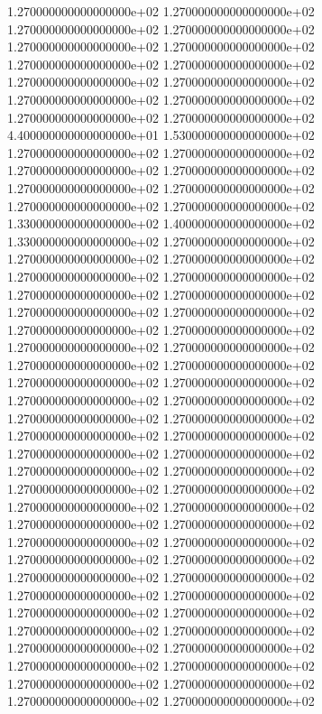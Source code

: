 1.270000000000000000e+02 1.270000000000000000e+02 1.270000000000000000e+02 1.270000000000000000e+02 1.270000000000000000e+02 1.270000000000000000e+02 1.270000000000000000e+02 1.270000000000000000e+02 1.270000000000000000e+02 1.270000000000000000e+02 1.270000000000000000e+02 1.270000000000000000e+02 1.270000000000000000e+02 1.270000000000000000e+02 4.400000000000000000e+01 1.530000000000000000e+02 1.270000000000000000e+02 1.270000000000000000e+02 1.270000000000000000e+02 1.270000000000000000e+02 1.270000000000000000e+02 1.270000000000000000e+02 1.270000000000000000e+02 1.270000000000000000e+02 1.330000000000000000e+02 1.400000000000000000e+02 1.330000000000000000e+02 1.270000000000000000e+02 1.270000000000000000e+02 1.270000000000000000e+02 1.270000000000000000e+02 1.270000000000000000e+02 1.270000000000000000e+02 1.270000000000000000e+02 1.270000000000000000e+02 1.270000000000000000e+02 1.270000000000000000e+02 1.270000000000000000e+02 1.270000000000000000e+02 1.270000000000000000e+02 1.270000000000000000e+02 1.270000000000000000e+02 1.270000000000000000e+02 1.270000000000000000e+02 1.270000000000000000e+02 1.270000000000000000e+02 1.270000000000000000e+02 1.270000000000000000e+02 1.270000000000000000e+02 1.270000000000000000e+02 1.270000000000000000e+02 1.270000000000000000e+02 1.270000000000000000e+02 1.270000000000000000e+02 1.270000000000000000e+02 1.270000000000000000e+02 1.270000000000000000e+02 1.270000000000000000e+02 1.270000000000000000e+02 1.270000000000000000e+02 1.270000000000000000e+02 1.270000000000000000e+02 1.270000000000000000e+02 1.270000000000000000e+02 1.270000000000000000e+02 1.270000000000000000e+02 1.270000000000000000e+02 1.270000000000000000e+02 1.270000000000000000e+02 1.270000000000000000e+02 1.270000000000000000e+02 1.270000000000000000e+02 1.270000000000000000e+02 1.270000000000000000e+02 1.270000000000000000e+02 1.270000000000000000e+02 1.270000000000000000e+02 1.270000000000000000e+02 1.270000000000000000e+02 1.270000000000000000e+02
